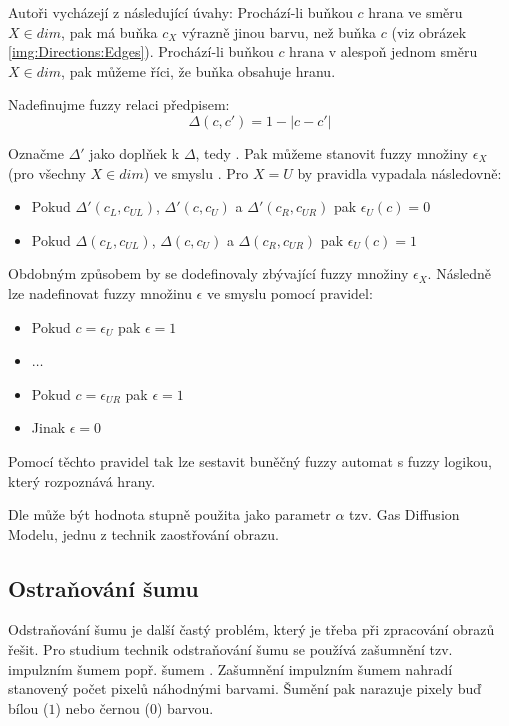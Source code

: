 \documentclass[a4paper,10pt]{article}
\begin{document}
Autoři vycházejí z následující úvahy: Prochází-li buňkou $c$ hrana ve směru $X \in dim$, pak má buňka $c_X$ výrazně jinou barvu, než buňka $c$ (viz obrázek \ref{img:Directions:Edges}). Prochází-li buňkou $c$ hrana v alespoň jednom směru $X \in dim$, pak můžeme říci, že buňka obsahuje hranu.

Nadefinujme fuzzy relaci  předpisem:
$$
  \Delta(c, c') = 1 - | c - c' |
$$

Označme $\Delta'$ jako doplňek k $\Delta$, tedy . Pak můžeme stanovit fuzzy množiny $\epsilon_X$ (pro všechny $X \in dim$) ve smyslu . Pro $X = U$ by pravidla vypadala následovně:
\begin{itemize}
 \item Pokud $\Delta'(c_{L}, c_{UL})$, $\Delta'(c, c_{U})$ a $\Delta'(c_{R}, c_{UR})$ pak $\epsilon_U(c) = 0$
 \item Pokud $\Delta (c_{L}, c_{UL})$, $\Delta (c, c_{U})$ a $\Delta (c_{R}, c_{UR})$ pak $\epsilon_U(c) = 1$
\end{itemize}

Obdobným způsobem by se dodefinovaly zbývající fuzzy množiny $\epsilon_X$. Následně lze nadefinovat fuzzy množinu $\epsilon$ ve smyslu  pomocí pravidel:
\begin{itemize}
 \item Pokud $c = \epsilon_{U}$ pak $\epsilon = 1$
 \item $\dots$
 \item Pokud $c = \epsilon_{UR}$ pak $\epsilon = 1$
 \item Jinak $\epsilon = 0$
\end{itemize}

Pomocí těchto pravidel tak lze sestavit buněčný fuzzy automat s fuzzy logikou, který rozpoznává hrany. 

Dle \cite{MarMeySol-HybMetGasDifModFuzCelAutImSha} může být hodnota stupně  použita jako parametr $\alpha$ tzv. Gas Diffusion Modelu, jednu z technik zaostřování obrazu.

\subsection{Ostraňování šumu}
Odstraňování šumu je další častý problém, který je třeba při zpracování obrazů řešit. Pro studium technik odstraňování šumu se používá zašumnění tzv. impulzním šumem popř. šumem . Zašumnění impulzním šumem nahradí stanovený počet pixelů náhodnými barvami. Šumění  pak narazuje pixely buď bílou ($1$) nebo černou ($0$) barvou.
\end{document}
